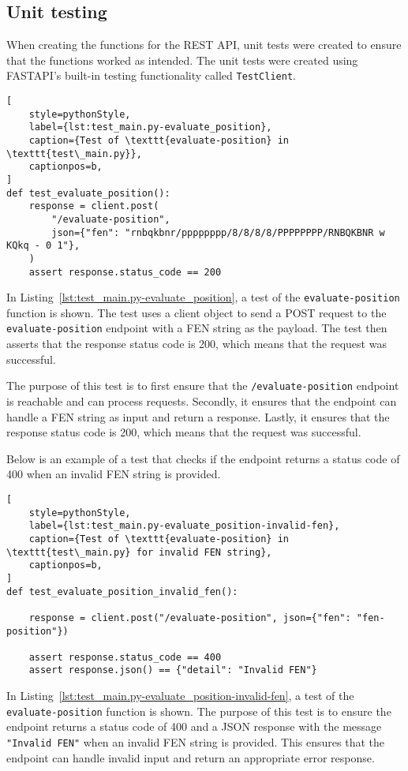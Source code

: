 \subsection{Unit testing}\label{subsec:unit-testing}
When creating the functions for the REST API, unit tests were created to ensure that the functions worked as intended.
The unit tests were created using FASTAPI's built-in testing functionality called \texttt{TestClient}.

\begin{lstlisting}[
    style=pythonStyle,
    label={lst:test_main.py-evaluate_position},
    caption={Test of \texttt{evaluate-position} in \texttt{test\_main.py}},
    captionpos=b,
]
def test_evaluate_position():
    response = client.post(
        "/evaluate-position",
        json={"fen": "rnbqkbnr/pppppppp/8/8/8/8/PPPPPPPP/RNBQKBNR w KQkq - 0 1"},
    )
    assert response.status_code == 200
\end{lstlisting}

In Listing~\ref{lst:test_main.py-evaluate_position}, a test of the \texttt{evaluate-position} function is shown.
The test uses a client object to send a POST request to the \texttt{evaluate-position} endpoint with a FEN string as
the payload.
The test then asserts that the response status code is 200, which means that the request was successful.

The purpose of this test is to first ensure that the \texttt{/evaluate-position} endpoint is reachable and can process
requests.
Secondly, it ensures that the endpoint can handle a FEN string as input and return a response.
Lastly, it ensures that the response status code is 200, which means that the request was successful.

\pagebreak

Below is an example of a test that checks if the endpoint returns a status code of 400 when an invalid FEN
string is provided.

\begin{lstlisting}[
    style=pythonStyle,
    label={lst:test_main.py-evaluate_position-invalid-fen},
    caption={Test of \texttt{evaluate-position} in \texttt{test\_main.py} for invalid FEN string},
    captionpos=b,
]
def test_evaluate_position_invalid_fen():

    response = client.post("/evaluate-position", json={"fen": "fen-position"})

    assert response.status_code == 400
    assert response.json() == {"detail": "Invalid FEN"}
\end{lstlisting}

In Listing~\ref{lst:test_main.py-evaluate_position-invalid-fen}, a test of the \texttt{evaluate-position} function is
shown.
The purpose of this test is to ensure the endpoint returns a status code of 400 and a JSON response with the
message \texttt{"Invalid FEN"} when an invalid FEN string is provided.
This ensures that the endpoint can handle invalid input and return an appropriate error response.
